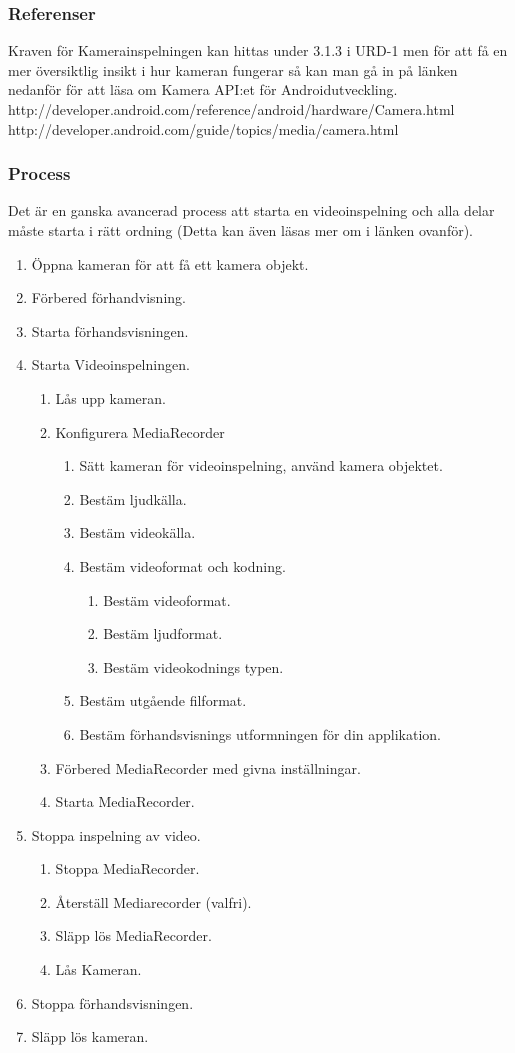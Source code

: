 \subsubsection{Referenser}
Kraven för Kamerainspelningen kan hittas under 3.1.3 i URD-1 men för att få en mer översiktlig insikt i hur kameran fungerar så kan man gå in på länken nedanför för att läsa om Kamera API:et för Androidutveckling.
http://developer.android.com/reference/android/hardware/Camera.html
http://developer.android.com/guide/topics/media/camera.html

\subsubsection{Process}
Det är en ganska avancerad process att starta en videoinspelning och alla delar måste starta i rätt ordning (Detta kan även läsas mer om i länken ovanför).
\begin{enumerate}
\item Öppna kameran för att få ett kamera objekt.
\item Förbered förhandvisning.
\item Starta förhandsvisningen.
\item Starta Videoinspelningen.
	\begin{enumerate}
		\item Lås upp kameran.
		\item Konfigurera MediaRecorder
		\begin{enumerate}
			\item Sätt kameran för videoinspelning, använd kamera objektet.
			\item Bestäm ljudkälla.
			\item Bestäm videokälla.
			\item Bestäm videoformat och kodning.
			\begin{enumerate}
				\item Bestäm videoformat.
				\item Bestäm ljudformat.
				\item Bestäm videokodnings typen.
			\end{enumerate}
			\item Bestäm utgående filformat.
			\item Bestäm förhandsvisnings utformningen för din applikation.
		\end{enumerate}
		\item Förbered MediaRecorder med givna inställningar.
		\item Starta MediaRecorder.
	\end{enumerate}
	\item Stoppa inspelning av video.
	\begin{enumerate}
		\item Stoppa MediaRecorder.
		\item Återställ Mediarecorder (valfri).
		\item Släpp lös MediaRecorder.
		\item Lås Kameran.
	\end{enumerate}
	\item Stoppa förhandsvisningen.
	\item Släpp lös kameran.
\end{enumerate}
